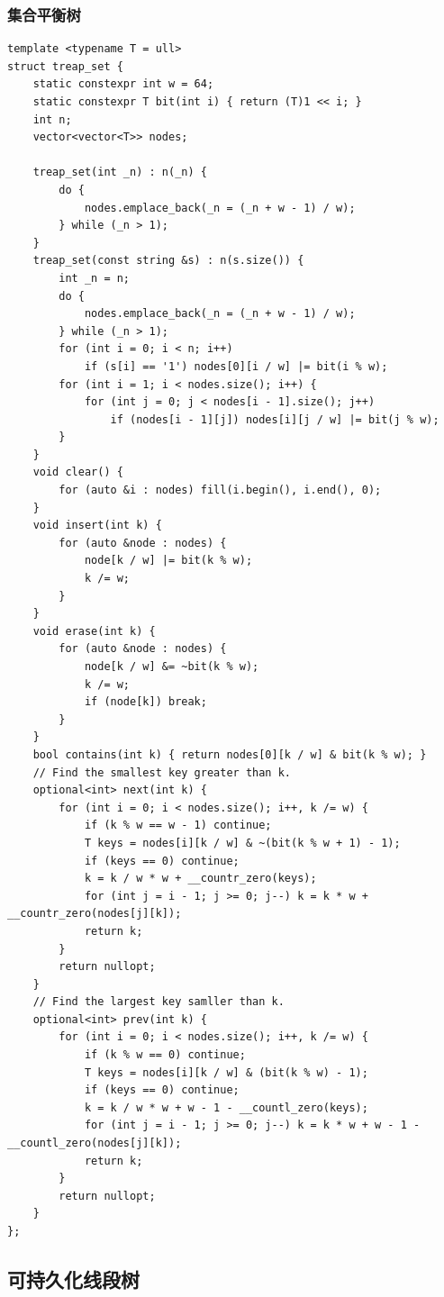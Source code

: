 \documentclass[UTF8, twoside]{ctexart}
\begin{document}
\begin{sloppypar}
\subsubsection{集合平衡树}

\begin{lstlisting}[style=cpp]
template <typename T = ull>
struct treap_set {
    static constexpr int w = 64;
    static constexpr T bit(int i) { return (T)1 << i; }
    int n;
    vector<vector<T>> nodes;

    treap_set(int _n) : n(_n) {
        do {
            nodes.emplace_back(_n = (_n + w - 1) / w);
        } while (_n > 1);
    }
    treap_set(const string &s) : n(s.size()) {
        int _n = n;
        do {
            nodes.emplace_back(_n = (_n + w - 1) / w);
        } while (_n > 1);
        for (int i = 0; i < n; i++)
            if (s[i] == '1') nodes[0][i / w] |= bit(i % w);
        for (int i = 1; i < nodes.size(); i++) {
            for (int j = 0; j < nodes[i - 1].size(); j++)
                if (nodes[i - 1][j]) nodes[i][j / w] |= bit(j % w);
        }
    }
    void clear() {
        for (auto &i : nodes) fill(i.begin(), i.end(), 0);
    }
    void insert(int k) {
        for (auto &node : nodes) {
            node[k / w] |= bit(k % w);
            k /= w;
        }
    }
    void erase(int k) {
        for (auto &node : nodes) {
            node[k / w] &= ~bit(k % w);
            k /= w;
            if (node[k]) break;
        }
    }
    bool contains(int k) { return nodes[0][k / w] & bit(k % w); }
    // Find the smallest key greater than k.
    optional<int> next(int k) {
        for (int i = 0; i < nodes.size(); i++, k /= w) {
            if (k % w == w - 1) continue;
            T keys = nodes[i][k / w] & ~(bit(k % w + 1) - 1);
            if (keys == 0) continue;
            k = k / w * w + __countr_zero(keys);
            for (int j = i - 1; j >= 0; j--) k = k * w + __countr_zero(nodes[j][k]);
            return k;
        }
        return nullopt;
    }
    // Find the largest key samller than k.
    optional<int> prev(int k) {
        for (int i = 0; i < nodes.size(); i++, k /= w) {
            if (k % w == 0) continue;
            T keys = nodes[i][k / w] & (bit(k % w) - 1);
            if (keys == 0) continue;
            k = k / w * w + w - 1 - __countl_zero(keys);
            for (int j = i - 1; j >= 0; j--) k = k * w + w - 1 - __countl_zero(nodes[j][k]);
            return k;
        }
        return nullopt;
    }
};
\end{lstlisting}

\subsection{可持久化线段树}


\end{sloppypar}
\end{document}
